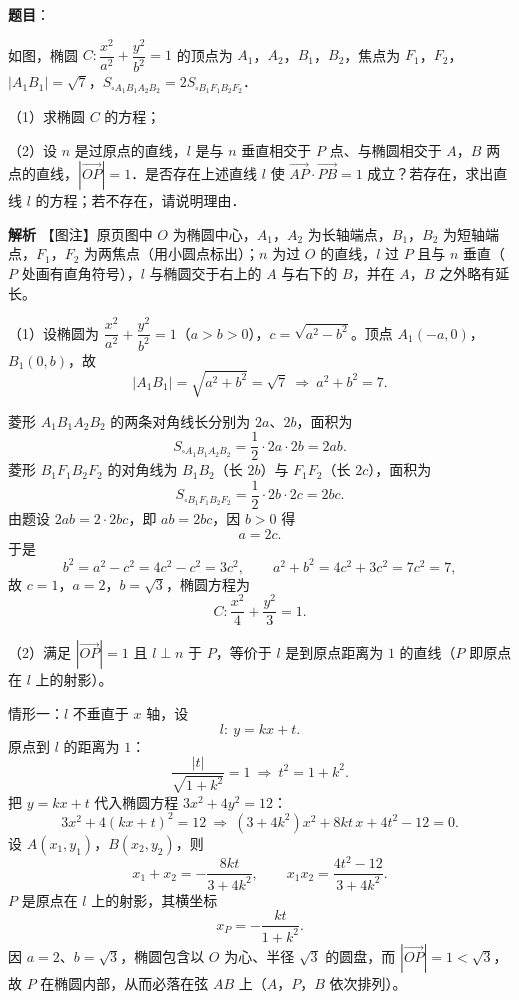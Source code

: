 \begin{answer}

\textbf{题目}：

如图，椭圆 $C:\dfrac{x^2}{a^2}+\dfrac{y^2}{b^2}=1$ 的顶点为 $A_1$，$A_2$，$B_1$，$B_2$，焦点为 $F_1$，$F_2$，$|A_1B_1|=\sqrt7$，$S_{\square A_1B_1A_2B_2}=2S_{\square B_1F_1B_2F_2}$．

（1）求椭圆 $C$ 的方程；

（2）设 $n$ 是过原点的直线，$l$ 是与 $n$ 垂直相交于 $P$ 点、与椭圆相交于 $A$，$B$ 两点的直线，$|\overrightarrow{OP}|=1$．是否存在上述直线 $l$ 使 $\overrightarrow{AP}\cdot\overrightarrow{PB}=1$ 成立？若存在，求出直线 $l$ 的方程；若不存在，请说明理由．
\nopagebreak[4]
\begin{center}\end{center}
\nopagebreak[4]
\textbf{解析}
【图注】原页图中 $O$ 为椭圆中心，$A_1$，$A_2$ 为长轴端点，$B_1$，$B_2$ 为短轴端点，$F_1$，$F_2$ 为两焦点（用小圆点标出）；$n$ 为过 $O$ 的直线，$l$ 过 $P$ 且与 $n$ 垂直（$P$ 处画有直角符号），$l$ 与椭圆交于右上的 $A$ 与右下的 $B$，并在 $A$，$B$ 之外略有延长。

（1）设椭圆为 $\dfrac{x^2}{a^2}+\dfrac{y^2}{b^2}=1$（$a>b>0$），$c=\sqrt{a^2-b^2}$。顶点 $A_1(-a,0)$，$B_1(0,b)$，故
\nopagebreak[4]
\[|A_1B_1|=\sqrt{a^2+b^2}=\sqrt7\ \Longrightarrow\ a^2+b^2=7.\]

菱形 $A_1B_1A_2B_2$ 的两条对角线长分别为 $2a$、$2b$，面积为
\nopagebreak[4]
\[S_{\square A_1B_1A_2B_2}=\frac12\cdot 2a\cdot 2b=2ab.\]
菱形 $B_1F_1B_2F_2$ 的对角线为 $B_1B_2$（长 $2b$）与 $F_1F_2$（长 $2c$），面积为
\nopagebreak[4]
\[S_{\square B_1F_1B_2F_2}=\frac12\cdot 2b\cdot 2c=2bc.\]
由题设 $2ab=2\cdot 2bc$，即 $ab=2bc$，因 $b>0$ 得
\nopagebreak[4]
\[a=2c.\]
于是
\nopagebreak[4]
\[b^2=a^2-c^2=4c^2-c^2=3c^2,\qquad a^2+b^2=4c^2+3c^2=7c^2=7,\]
故 $c=1$，$a=2$，$b=\sqrt3$，椭圆方程为
\nopagebreak[4]
\[C:\frac{x^2}{4}+\frac{y^2}{3}=1.\]

（2）满足 $|\overrightarrow{OP}|=1$ 且 $l\perp n$ 于 $P$，等价于 $l$ 是到原点距离为 $1$ 的直线（$P$ 即原点在 $l$ 上的射影）。

情形一：$l$ 不垂直于 $x$ 轴，设
\nopagebreak[4]
\[l:\ y=kx+t.\]
原点到 $l$ 的距离为 $1$：
\nopagebreak[4]
\[\frac{|t|}{\sqrt{1+k^2}}=1\ \Longrightarrow\ t^2=1+k^2.\]
把 $y=kx+t$ 代入椭圆方程 $3x^2+4y^2=12$：
\nopagebreak[4]
\[3x^2+4(kx+t)^2=12\ \Longrightarrow\ (3+4k^2)x^2+8kt\,x+4t^2-12=0.\]
设 $A(x_1,y_1)$，$B(x_2,y_2)$，则
\nopagebreak[4]
\[x_1+x_2=-\frac{8kt}{3+4k^2},\qquad x_1x_2=\frac{4t^2-12}{3+4k^2}.\]
$P$ 是原点在 $l$ 上的射影，其横坐标
\nopagebreak[4]
\[x_P=-\frac{kt}{1+k^2}.\]
因 $a=2$、$b=\sqrt3$，椭圆包含以 $O$ 为心、半径 $\sqrt3$ 的圆盘，而 $|\overrightarrow{OP}|=1<\sqrt3$，故 $P$ 在椭圆内部，从而必落在弦 $AB$ 上（$A$，$P$，$B$ 依次排列）。


\end{answer}
